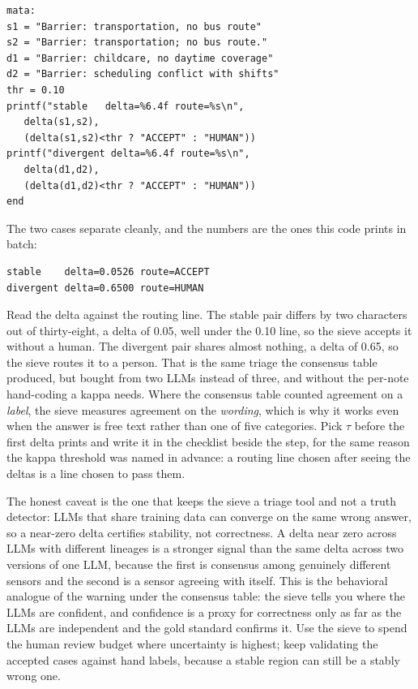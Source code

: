 \documentclass[
    a4paper,
    fontsize=10pt,
    twoside=true,
    numbers=noenddot,
]{kaobook}
\begin{document}
\par
{\footnotesize
\begin{verbatim}
mata:
s1 = "Barrier: transportation, no bus route"
s2 = "Barrier: transportation; no bus route."
d1 = "Barrier: childcare, no daytime coverage"
d2 = "Barrier: scheduling conflict with shifts"
thr = 0.10
printf("stable   delta=%6.4f route=%s\n",
   delta(s1,s2),
   (delta(s1,s2)<thr ? "ACCEPT" : "HUMAN"))
printf("divergent delta=%6.4f route=%s\n",
   delta(d1,d2),
   (delta(d1,d2)<thr ? "ACCEPT" : "HUMAN"))
end
\end{verbatim}
}
The two cases separate cleanly, and the numbers are the ones this code prints in batch:
\par
{\footnotesize
\begin{verbatim}
stable    delta=0.0526 route=ACCEPT
divergent delta=0.6500 route=HUMAN
\end{verbatim}
}
Read the delta against the routing line. The stable pair differs by two characters out of thirty-eight, a delta of 0.05, well under the 0.10 line, so the sieve accepts it without a human. The divergent pair shares almost nothing, a delta of 0.65, so the sieve routes it to a person. That is the same triage the consensus table produced, but bought from two LLMs instead of three, and without the per-note hand-coding a kappa needs. Where the consensus table counted agreement on a \emph{label}, the sieve measures agreement on the \emph{wording}, which is why it works even when the answer is free text rather than one of five categories. Pick $\tau$ before the first delta prints and write it in the checklist beside the step, for the same reason the kappa threshold was named in advance: a routing line chosen after seeing the deltas is a line chosen to pass them.

The honest caveat is the one that keeps the sieve a triage tool and not a truth detector: LLMs that share training data can converge on the same wrong answer, so a near-zero delta certifies stability, not correctness. A delta near zero across LLMs with different lineages is a stronger signal than the same delta across two versions of one LLM, because the first is consensus among genuinely different sensors and the second is a sensor agreeing with itself. This is the behavioral analogue of the warning under the consensus table: the sieve tells you where the LLMs are confident, and confidence is a proxy for correctness only as far as the LLMs are independent and the gold standard confirms it. Use the sieve to spend the human review budget where uncertainty is highest; keep validating the accepted cases against hand labels, because a stable region can still be a stably wrong one.
\end{document}
